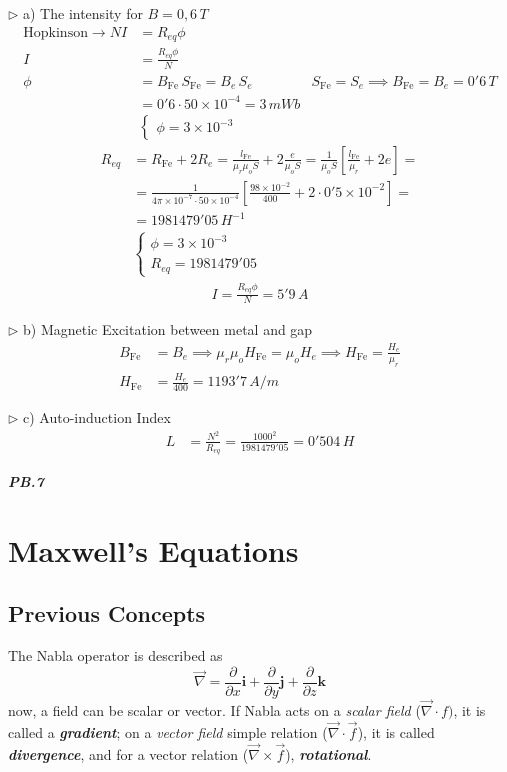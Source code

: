 \documentclass[a4paper]{article}
\begin{document}
$\triangleright$ a) The intensity for $B=0,6\,T$
\begin{align}
\text{Hopkinson}\to NI&=R_{eq}\phi \\
I&=\frac{R_{eq}\phi}{N} \\
\phi&=B_{\text{Fe}}\,S_{\text{Fe}}=B_{e}\,S_{e} & S_{\text{Fe}}=S_{e}\implies B_{\text{Fe}}=B_{e}=0'6\,T \\
&=0'6\cdot 50\times 10^{-4}=3\,mWb \\
&\begin{cases}
\phi=3\times 10^{-3}
\end{cases}
\end{align}
\begin{align}
R_{eq}&=R_{\text{Fe}}+2R_{e}=\frac{l_{\text{Fe}}}{\mu_{r}\mu_{o}S}+2 \frac{e}{\mu_{o}S}=\frac{1}{\mu_{o}S}\left[ \frac{l_{\text{Fe}}}{\mu_{r}}+2e \right]= \\
&=\frac{1}{4\pi \times 10^{-7}\cdot 50\times 10^{-4}}\left[ \frac{98\times 10^{-2}}{400}+2\cdot 0'5\times 10^{-2} \right]= \\
&=1981479'05\,H^{-1} \\
&\begin{cases}
\phi=3 \times 10^{-3} \\
R_{eq}=1981479'05
\end{cases}
\end{align}
\begin{align}
I=\frac{R_{eq}\phi}{N}=\boxed{5'9\,A}
\end{align}

$\triangleright$ b) Magnetic Excitation between metal and gap
\begin{align}
B_{\text{Fe}}&=B_{e}\implies \mu_{r}\mu_{o}H_{\text{Fe}}=\mu_{o}H_{e}\implies H_{\text{Fe}}=\frac{H_{e}}{\mu_{r}} \\
H_{\text{Fe}}&=\frac{H_{e}}{400}=\boxed{1193'7\,A / m}
\end{align}

$\triangleright$ c) Auto-induction Index
\begin{align}
L&=\frac{N^{2}}{R_{eq}}=\frac{1000^{2}}{1981479'05}=\boxed{0'504\,H}
\end{align}

\textbf{\textit{PB.7}}

\section{Maxwell's Equations}

\setcounter{equation}{0}
\subsection{Previous Concepts}
\setcounter{equation}{0}
The Nabla operator is described as
$$
\vec{\nabla}=\frac{\partial}{\partial x}\mathbf{i}+\frac{\partial}{\partial y}\mathbf{j}+\frac{\partial}{\partial z}\mathbf{k}
$$
now, a field can be scalar or vector. If Nabla acts on a \textit{scalar field} ($\vec{\nabla}\cdot f)$, it is called a \textbf{\textit{gradient}}; on a \textit{vector field} simple relation ($\vec{\nabla}\cdot\vec{f}$), it is called \textit{\textbf{divergence}}, and for a vector relation ($\vec{\nabla}\times \vec{f}$), \textit{\textbf{rotational}}.
\end{document}
